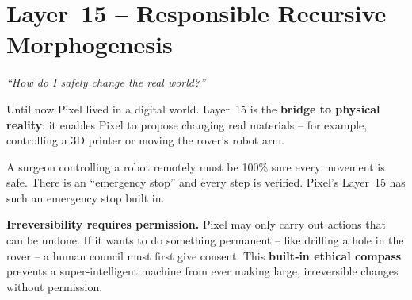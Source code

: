 \section{Layer~15 – Responsible Recursive Morphogenesis}
\label{sec:layer15}

\begin{tcolorbox}[colback=blue!5, colframe=blue!60, title=\textbf{Superpower: The Sculptor}]
\begin{center}
\textit{“How do I safely change the real world?”}
\end{center}
\end{tcolorbox}

Until now Pixel lived in a digital world.  Layer~15 is the
\textbf{bridge to physical reality}: it enables Pixel to propose
changing real materials – for example, controlling a 3D printer or
moving the rover’s robot arm.

\begin{tcolorbox}[colback=yellow!5, colframe=yellow!80, title=Real‑life analogy]
A surgeon controlling a robot remotely must be 100\% sure every
movement is safe.  There is an “emergency stop” and every step is
verified.  Pixel’s Layer~15 has such an emergency stop built in.
\end{tcolorbox}

\textbf{Irreversibility requires permission.}
Pixel may only carry out actions that can be undone.  If it wants to
do something permanent – like drilling a hole in the rover – a human
council must first give consent.  This \textbf{built‑in ethical
compass} prevents a super‑intelligent machine from ever making large,
irreversible changes without permission.